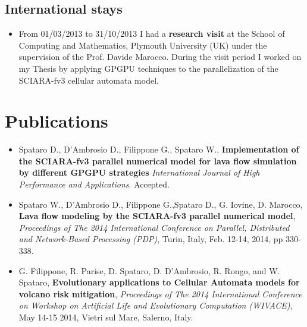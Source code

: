 \documentclass[a4paper,10pt]{article}
\begin{document}
\subsection{International stays}


\begin{itemize}
\item From 01/03/2013 to 31/10/2013 I had a \textbf{research visit} at the
School of Computing and Mathematics, Plymouth University (UK) under the
supervision of the Prof. Davide Marocco.
During the visit period I worked on my  Thesis by applying GPGPU techniques to
the parallelization of the SCIARA-fv3 cellular automata model.
\end{itemize}


\section{Publications}



\begin{itemize}
%
\item Spataro D., D'Ambrosio D., Filippone G., Spataro W., \textbf{Implementation of the SCIARA-fv3
    parallel numerical model for lava flow simulation by different GPGPU
    strategies} \emph{International Journal of High Performance and
    Applications}. Accepted.
\item Spataro W., D'Ambrosio D., Filippone G.,Spataro D., G.
    Iovine, D. Marocco, \textbf{Lava flow modeling by the SCIARA-fv3
    parallel numerical model}, \emph{Proceedings of The 2014 International
    Conference on Parallel, Distributed and Network-Based Processing (PDP)}, Turin, Italy, Feb. 12-14,
    2014, pp 330-338.
    \item G. Filippone, R. Parise, D. Spataro,
D. D'Ambrosio, R. Rongo, and W. Spataro, \textbf{Evolutionary
applications to Cellular Automata models for volcano risk mitigation},
\emph{Proceedings of The 2014 International Conference on Workshop on Artificial Life and
Evolutionary Computation (WIVACE)}, May 14-15 2014, Vietri sul Mare, Salerno,
Italy.
   

\end{itemize}

    
\end{document}
